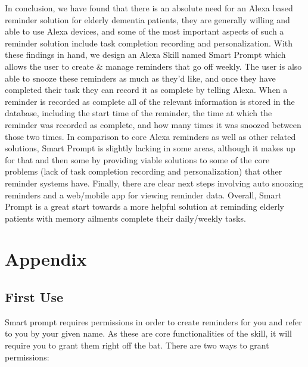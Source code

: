 \documentclass[11pt, oneside]{article}
\begin{document}
In conclusion, we have found that there is an absolute need for an Alexa based reminder solution for elderly dementia patients, they are generally willing and able to use Alexa devices, and some of the most important aspects of such a reminder solution include task completion recording and personalization. 
With these findings in hand, we design an Alexa Skill named Smart Prompt which allows the user to create \& manage reminders that go off weekly. 
The user is also able to snooze these reminders as much as they'd like, and once they have completed their task they can record it as complete by telling Alexa. 
When a reminder is recorded as complete all of the relevant information is stored in the database, including the start time of the reminder, the time at which the reminder was recorded as complete, and how many times it was snoozed between those two times. 
In comparison to core Alexa reminders as well as other related solutions, Smart Prompt is slightly lacking in some areas, although it makes up for that and then some by providing viable solutions to some of the core problems (lack of task completion recording and personalization) that other reminder systems have. 
Finally, there are clear next steps involving auto snoozing reminders and a web/mobile app for viewing reminder data. 
Overall, Smart Prompt is a great start towards a more helpful solution at reminding elderly patients with memory ailments complete their daily/weekly tasks. 


\section{Appendix}

\subsection{First Use}

Smart prompt requires permissions in order to create reminders for you and refer to you by your given name. As these are core functionalities of the skill, it will require you to grant them right off the bat.
There are two ways to grant permissions:
\end{document}
